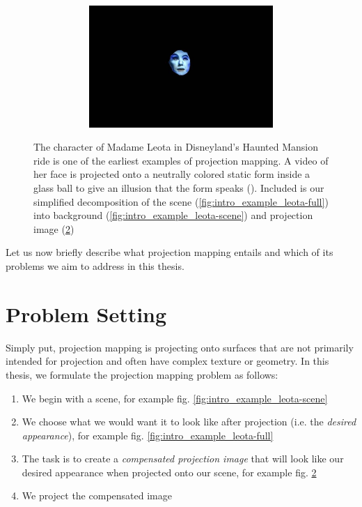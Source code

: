 \begin{figure}[ht]
\begin{subfigure}{0.39\textwidth}
        \begin{subfigure}{\textwidth}
            \centering
            \includegraphics[width=\textwidth]{images/01-Leota-only_head.jpg}
            \caption{}
            \label{fig:intro_example_leota-head}
        \end{subfigure}
    \end{subfigure}
    \caption{The character of Madame Leota in Disneyland's Haunted Mansion ride is one of the earliest examples of projection mapping. A video of her face is projected onto a neutrally colored static form inside a glass ball to give an illusion that the form speaks (\citet{MadameLeota}). Included is our simplified decomposition of the scene (\ref{fig:intro_example_leota-full}) into background (\ref{fig:intro_example_leota-scene}) and projection image (\ref{fig:intro_example_leota-head})}
    \label{fig:intro_example_leota}
\end{figure}

Let us now briefly describe what projection mapping entails and which of its problems we aim to address in this thesis.

\section{Problem Setting}
\label{section:intro-problem_setting}

Simply put, projection mapping is projecting onto surfaces that are not primarily intended for projection and often have complex texture or geometry. In this thesis, we formulate the projection mapping problem as follows:

\begin{enumerate}
    \item We begin with a scene, for example fig. \ref{fig:intro_example_leota-scene}
    \item We choose what we would want it to look like after projection (i.e. the \textit{desired appearance}), for example fig. \ref{fig:intro_example_leota-full}
    \item The task is to create a \textit{compensated projection image} that will look like our desired appearance when projected onto our scene, for example fig. \ref{fig:intro_example_leota-head}
    \item We project the compensated image
\end{enumerate}

